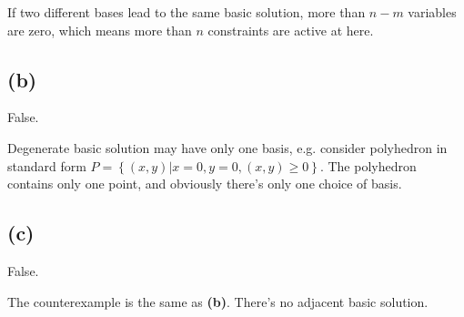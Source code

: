 \documentclass[12pt]{article}
\begin{document}
If two different bases lead to the same basic solution, more than $n-m$ variables are zero, which means more than $n$ constraints are active at here.

\subsection*{(b)}
False.

Degenerate basic solution may have only one basis, e.g. consider polyhedron in standard form $P=\left\{(x,y)\big|x=0,y=0,(x,y)\ge 0\right\}$. The polyhedron contains only one point, and obviously there's only one choice of basis.

\subsection*{(c)}
False.

The counterexample is the same as \textbf{(b)}. There's no adjacent basic solution.
\end{document}
